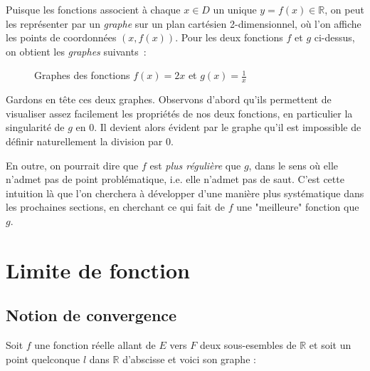 Puisque les fonctions associent à chaque $x \in D$ un unique $y = f(x) \in \mathbb{R}$, on peut les représenter par un \emph{graphe} sur un plan cartésien 2-dimensionnel, où l'on affiche les points de coordonnées $(x, f(x))$. Pour les deux fonctions $f$ et $g$ ci-dessus, on obtient les \emph{graphes} suivants~:
\begin{figure}[H]
    \centering
    \caption{Graphes des fonctions $f(x) = 2x$ et $g(x) = \frac{1}{x}$}
    \label{fig:graph_basic_functions}
\end{figure}

Gardons en tête ces deux graphes. Observons d'abord qu'ils permettent de visualiser assez facilement les propriétés de nos deux fonctions, en particulier la singularité de $g$ en 0. Il devient alors évident par le graphe qu'il est impossible de définir naturellement la division par $0$.

En outre, on pourrait dire que $f$ est \emph{plus régulière} que $g$, dans le sens où elle n'admet pas de point problématique, i.e. elle n'admet pas de saut. C'est cette intuition là que l'on cherchera à développer d'une manière plus systématique dans les prochaines sections, en cherchant ce qui fait de $f$ une "meilleure" fonction que $g$.



\section{Limite de fonction}
\subsection{Notion de convergence}
Soit $f$ une fonction réelle allant de $E$ vers $F$ deux sous-esembles de $\mathbb{R}$ et soit un point quelconque $l$ dans  $\mathbb{R}$ d'abscisse et voici son graphe :

